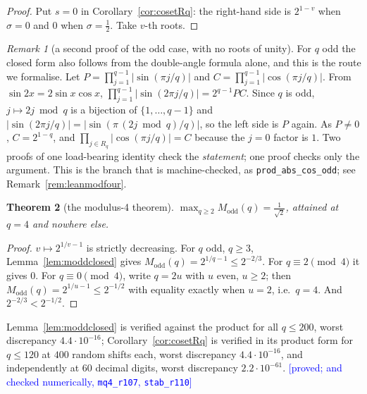 \documentclass[11pt,a4paper]{article}
\theoremstyle{plain}
\newtheorem{theorem}{Theorem}[section]
\theoremstyle{definition}
\theoremstyle{remark}
\newtheorem{remark}[theorem]{Remark}
\newcommand{\Lean}[1]{\texttt{#1}}
\newcommand{\STATUS}[1]{\textcolor{blue}{\textsf{[#1]}}}
\begin{document}
\begin{proof}
Put $s=0$ in Corollary~\ref{cor:cosetRq}: the right-hand side is $2^{1-v}$ when $\sigma=0$ and
$0$ when $\sigma=\tfrac12$. Take $v$-th roots.
\end{proof}

\begin{remark}[a second proof of the odd case, with no roots of unity]\label{rem:doubleangle}
For $q$ odd the closed form also follows from the double-angle formula alone, and this is the
route we formalise. Let $P=\prod_{j=1}^{q-1}|\sin(\pi j/q)|$ and $C=\prod_{j=1}^{q-1}|\cos(\pi
j/q)|$. From $\sin2x=2\sin x\cos x$, $\prod_{j=1}^{q-1}|\sin(2\pi j/q)|=2^{q-1}PC$. Since $q$ is
odd, $j\mapsto 2j\bmod q$ is a bijection of $\{1,\dots,q-1\}$ and
$|\sin(2\pi j/q)|=|\sin(\pi\,(2j\bmod q)/q)|$, so the left side is $P$ again. As $P\ne0$,
$C=2^{1-q}$, and $\prod_{j\in R_q}|\cos(\pi j/q)|=C$ because the $j=0$ factor is $1$. Two proofs
of one load-bearing identity check the \emph{statement}; one proof checks only the argument.
This is the branch that is machine-checked, as \Lean{prod\_abs\_cos\_odd}; see
Remark~\ref{rem:leanmodfour}.
\end{remark}

\begin{theorem}[the modulus-4 theorem]\label{thm:modfour}
$\displaystyle\max_{q\ge2}M_{\mathrm{odd}}(q)=\frac1{\sqrt2}$, attained at $q=4$ and nowhere
else.
\end{theorem}

\begin{proof}
$v\mapsto2^{1/v-1}$ is strictly decreasing. For $q$ odd, $q\ge3$, Lemma~\ref{lem:moddclosed}
gives $M_{\mathrm{odd}}(q)=2^{1/q-1}\le2^{-2/3}$. For $q\equiv2\pmod4$ it gives $0$. For
$q\equiv0\pmod4$, write $q=2u$ with $u$ even, $u\ge2$; then
$M_{\mathrm{odd}}(q)=2^{1/u-1}\le2^{-1/2}$ with equality exactly when $u=2$, i.e.\ $q=4$. And
$2^{-2/3}<2^{-1/2}$.
\end{proof}

Lemma~\ref{lem:moddclosed} is verified against the product for all $q\le200$, worst discrepancy
$4.4\cdot10^{-16}$; Corollary~\ref{cor:cosetRq} is verified in its product form for $q\le120$ at
$400$ random shifts each, worst discrepancy $4.4\cdot10^{-16}$, and independently at $60$ decimal
digits, worst discrepancy $2.2\cdot10^{-61}$.
\STATUS{proved; and checked numerically, \texttt{mq4\_r107}, \texttt{stab\_r110}}
\end{document}

